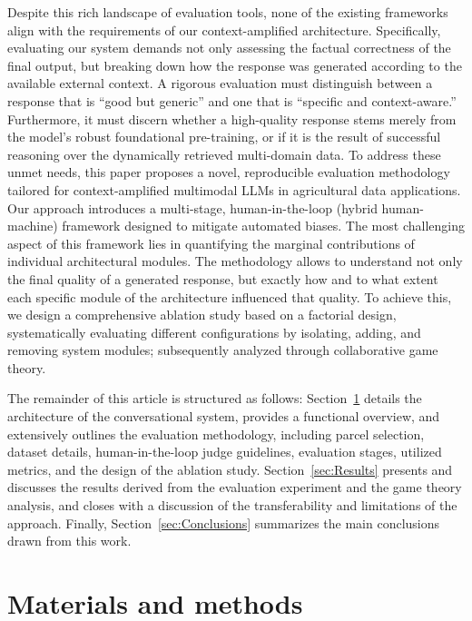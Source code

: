 \documentclass[preprint,review,12pt,authoryear]{elsarticle}
\begin{document}
Despite this rich landscape of evaluation tools, none of the existing frameworks align with the requirements of our context-amplified architecture. Specifically, evaluating our system demands not only assessing the factual correctness of the final output, but breaking down how the response was generated according to the available external context. A rigorous evaluation must distinguish between a response that is ``good but generic'' and one that is ``specific and context-aware.'' Furthermore, it must discern whether a high-quality response stems merely from the model's robust foundational pre-training, or if it is the result of successful reasoning over the dynamically retrieved multi-domain data. To address these unmet needs, this paper proposes a novel, reproducible evaluation methodology tailored for context-amplified multimodal LLMs in agricultural data applications. Our approach introduces a multi-stage, human-in-the-loop (hybrid human-machine) framework designed to mitigate automated biases. The most challenging aspect of this framework lies in quantifying the marginal contributions of individual architectural modules. The methodology allows to understand not only the final quality of a generated response, but exactly how and to what extent each specific module of the architecture influenced that quality. To achieve this, we design a comprehensive ablation study based on a factorial design, systematically evaluating different configurations by isolating, adding, and removing system modules; subsequently analyzed through collaborative game theory. 

The remainder of this article is structured as follows: Section~\ref{sec:Methods} details the architecture of the conversational system, provides a functional overview, and extensively outlines the evaluation methodology, including parcel selection, dataset details, human-in-the-loop judge guidelines, evaluation stages, utilized metrics, and the design of the ablation study. Section~\ref{sec:Results} presents and discusses the results derived from the evaluation experiment and the game theory analysis, and closes with a discussion of the transferability and limitations of the approach. Finally, Section~\ref{sec:Conclusions} summarizes the main conclusions drawn from this work.


\section{Materials and methods}
\label{sec:Methods}
\end{document}
